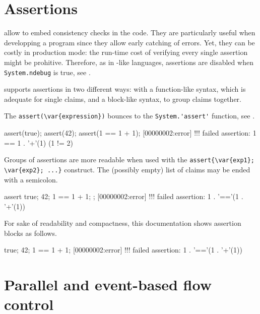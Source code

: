 
\section{Assertions}
\label{sec:assertions}

 allow to embed consistency checks in the
code.  They are particularly useful when developping a program since
they allow early catching of errors.  Yet, they can be costly in
production mode: the run-time cost of verifying every single assertion
might be prohitive.  Therefore, as in \C-like languages, assertions
are disabled when \lstinline|System.ndebug| is true, see .

\us supports assertions in two different ways: with a function-like
syntax, which is adequate for single claims, and a block-like syntax,
to group claims together.

The \lstinline|assert(\var{expression})| bounces to the
\lstinline|System.'assert'| function, see .

\begin{urbiscript}[firstnumber=last]
assert(true);
assert(42);
assert(1 == 1 + 1);
[00000002:error] !!! failed assertion: 1 == 1 . '+'(1) (1 != 2)
\end{urbiscript}

Groups of assertions are more readable when used with the
\lstinline|assert{\var{exp1}; \var{exp2}; ...}| construct.  The
(possibly empty) list of claims may be ended with a semicolon.

\begin{urbiscript}[firstnumber=last]
assert
{
  true;
  42;
  1 == 1 + 1;
};
[00000002:error] !!! failed assertion: 1 . '=='(1 . '+'(1))
\end{urbiscript}

For sake of readability and compactness, this documentation shows
assertion blocks as follows.

\begin{urbiassert}[firstnumber=last]
true;
42;
1 == 1 + 1;
[00000002:error] !!! failed assertion: 1 . '=='(1 . '+'(1))
\end{urbiassert}


\section{Parallel and event-based flow control}

